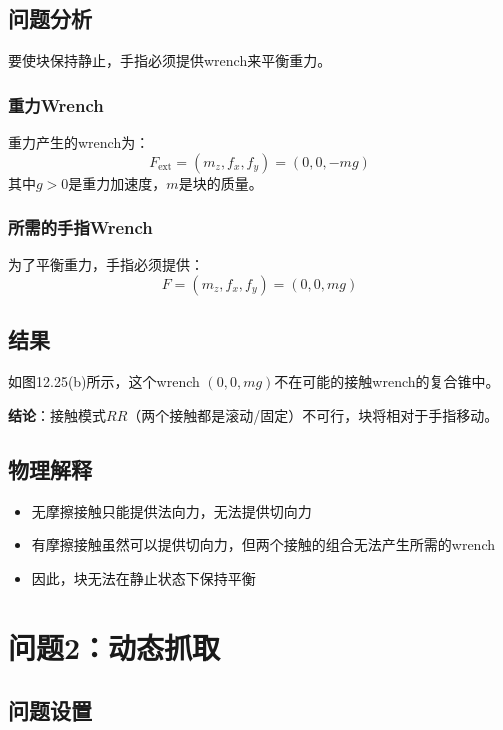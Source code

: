 \documentclass[12pt,a4paper]{article}
\begin{document}
\subsection{问题分析}

要使块保持静止，手指必须提供wrench来平衡重力。

\subsubsection{重力Wrench}

重力产生的wrench为：
\begin{equation}
F_{\text{ext}} = (m_z, f_x, f_y) = (0, 0, -mg)
\end{equation}
其中$g > 0$是重力加速度，$m$是块的质量。

\subsubsection{所需的手指Wrench}

为了平衡重力，手指必须提供：
\begin{equation}
F = (m_z, f_x, f_y) = (0, 0, mg)
\end{equation}

\subsection{结果}

如图12.25(b)所示，这个wrench $(0, 0, mg)$不在可能的接触wrench的复合锥中。

\textbf{结论}：接触模式$RR$（两个接触都是滚动/固定）不可行，块将相对于手指移动。

\subsection{物理解释}

\begin{itemize}
    \item 无摩擦接触只能提供法向力，无法提供切向力
    \item 有摩擦接触虽然可以提供切向力，但两个接触的组合无法产生所需的wrench
    \item 因此，块无法在静止状态下保持平衡
\end{itemize}

\section{问题2：动态抓取}

\subsection{问题设置}
\end{document}
